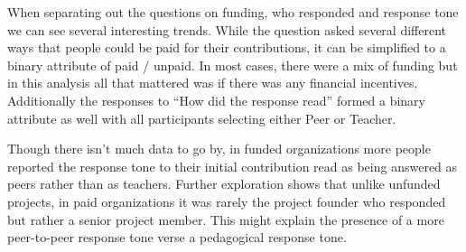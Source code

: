 When separating out the questions on funding, who responded and response tone we can see several interesting trends. While the question asked several different ways that people could be paid for their contributions, it can be simplified to a binary attribute of paid / unpaid. In most cases, there were a mix of funding but in this analysis all that mattered was if there was any financial incentives. Additionally the responses to “How did the response read” formed a binary attribute as well with all participants selecting either Peer or Teacher.

Though there isn't much data to go by, in funded organizations more people reported the response tone to their initial contribution read as being answered as peers rather than as teachers. Further exploration shows that unlike unfunded projects, in paid organizations it was rarely the project founder who responded but rather a senior project member. This might explain the presence of a more peer-to-peer response tone verse a pedagogical response tone.